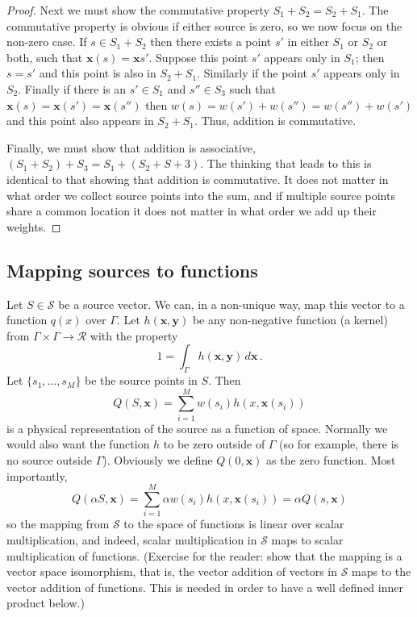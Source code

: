 \documentclass[12pt]{article}
\begin{document}
\begin{proof}
Next we must show the commutative property $S_1 + S_2 = S_2 + S_1$.   The commutative property is obvious if either source is zero, so we now focus on the non-zero case.  If $s \in S_1 + S_2$ then there exists a point $s'$ in either $S_1$ or $S_2$ or both, such that $\mathbf{x}(s) = \mathbf{x}{s'}$.  Suppose this point $s'$ appears only in $S_1$; then $s = s'$ and this point is also in $S_2 + S_1$.  Similarly if the point $s'$ appears only in $S_2$.  Finally if there is an $s' \in S_1$ and $s'' \in S_3$ such that $\mathbf{x}(s) = \mathbf{x}(s') = \mathbf{x}(s'')$ then $w(s) = w(s') + w(s'') = w(s'') + w(s')$ and this point also appears in $S_2 + S_1$.  Thus, addition is commutative.

Finally, we must show that addition is associative, $(S_1 + S_2) + S_3 = S_1 + (S_2 + S+3)$.  The thinking that leads to this is identical to that showing that addition is commutative.  It does not matter in what order we collect source points into the sum, and if multiple source points share a common location it does not matter in what order we add up their weights. 
\end{proof}

\subsection{Mapping sources to functions}

Let $S \in \mathcal{S}$ be a source vector.  We can, in a non-unique way, map this vector to a function $q(x)$ over $\Gamma$.  Let $h(\mathbf{x}, \mathbf{y})$ be any non-negative function (a kernel) from $\Gamma \times \Gamma \to \mathcal{R}$ with the property 
\begin{equation}
1 = \int_{\Gamma} h(\mathbf{x}, \mathbf{y}) \, d\mathbf{x} \,.
\end{equation} 
Let $\{s_1, \ldots, s_M\}$ be the source points in $S$.  Then 
\begin{equation}
Q(S, \mathbf{x}) = \sum_{i=1}^M w(s_i) h(x, \mathbf{x}(s_i))
\end{equation}
is a physical representation of the source as a function of space.   Normally we would also want the function $h$ to be zero outside of $\Gamma$ (so for example, there is no source outside $\Gamma$).  Obviously we define $Q(0, \mathbf{x})$ as the zero function.  Most importantly,
\begin{equation}
Q(\alpha S, \mathbf{x}) = \sum_{i=1}^M \alpha w(s_i) h(x, \mathbf{x}(s_i)) = \alpha Q(s, \mathbf{x})
\end{equation}
so the mapping from $\mathcal{S}$ to the space of functions is linear over scalar multiplication, and indeed, scalar multiplication in $\mathcal{S}$ maps to scalar multiplication of functions.  (Exercise for the reader: show that the mapping is a vector space isomorphism, that is, the vector addition of vectors in $\mathcal{S}$ maps to the vector addition of functions.  This is needed in order to have a well defined inner product below.)
\end{document}
